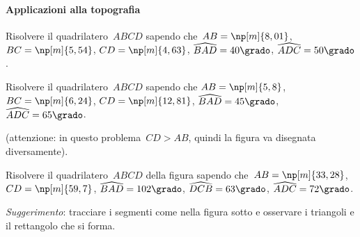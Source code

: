 \paragraph{Applicazioni alla topografia}

\begin{multicols}{2}
 \begin{esercizio}
\label{ese:G.34}
Risolvere il quadrilatero~$ABCD$ sapendo che~${AB}=\np[m]{8,01}$,
${BC}=\np[m]{5,54}$, ${CD}=\np[m]{4,63}$, $\widehat{BAD}=40\grado$, $\widehat{ADC}=50\grado$.
\end{esercizio}

\begin{esercizio}
\label{ese:G.35}
Risolvere il quadrilatero~$ABCD$ sapendo che ${AB}=\np[m]{5,8}$, ${BC}=\np[m]{6,24}$,
${CD}=\np[m]{12,81}$, $\widehat{BAD}=45\grado$, $\widehat{ADC}=65\grado$.

(attenzione: in questo problema~${CD}>{AB}$, quindi la figura va disegnata diversamente).
\end{esercizio}

 \begin{esercizio}
\label{ese:G.36}
Risolvere il quadrilatero~$ABCD$ della figura sapendo che~${AB}=\np[m]{33,28}$, ${CD}=\np[m]{59,7}$,
$\widehat{BAD}=102\grado$, $\widehat{DCB}=63\grado$, $\widehat{ADC}=72\grado$.

\emph{Suggerimento}: tracciare i segmenti come nella figura sotto e osservare i triangoli e il rettangolo che si forma.
\end{esercizio}
\begin{center}
 
\end{center}
\end{multicols}

\pagebreak

